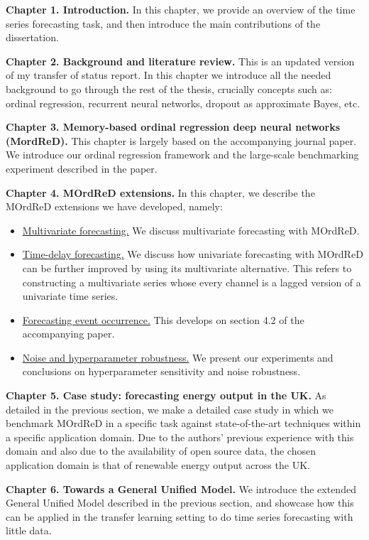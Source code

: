 \documentclass[pdftex,12pt,a4paper]{article}
\theoremstyle{definition}
\theoremstyle{remark}
\begin{document}
\textbf{Chapter 1. Introduction.} In this chapter, we provide an overview of the time series forecasting task, and then introduce the main contributions of the dissertation.

\textbf{Chapter 2. Background and literature review.} This is an updated version of my transfer of status report. In this chapter we introduce all the needed background to go through the rest of the thesis, crucially concepts such as: ordinal regression, recurrent neural networks, dropout as approximate Bayes, etc.

\textbf{Chapter 3. Memory-based ordinal regression deep neural networks (MordReD).} This chapter is largely based on the accompanying journal paper. We introduce our ordinal regression framework and the large-scale benchmarking experiment described in the paper.

\textbf{Chapter 4. MOrdReD extensions.} In this chapter, we describe the MOrdReD extensions we have developed, namely: 
\begin{itemize}
    \item \underline{Multivariate forecasting.} We discuss multivariate forecasting with MOrdReD.
    \item \underline{Time-delay forecasting.} We discuss how univariate forecasting with MOrdReD can be further improved by using its multivariate alternative. This refers to constructing a multivariate series whose every channel is a lagged version of a univariate time series.
    \item \underline{Forecasting event occurrence.} This develops on section 4.2 of the accompanying paper.
    \item \underline{Noise and hyperparameter robustness.} We present our experiments and conclusions on hyperparameter sensitivity and noise robustness.
\end{itemize}

\textbf{Chapter 5. Case study: forecasting energy output in the UK.} As detailed in the previous section, we make a detailed case study in which we benchmark MOrdReD in a specific task against state-of-the-art techniques within a specific application domain. Due to the authors' previous experience with this domain and also due to the availability of open source data, the chosen application domain is that of renewable energy output across the UK.

\textbf{Chapter 6. Towards a General Unified Model.} We introduce the extended General Unified Model described in the previous section, and showcase how this can be applied in the transfer learning setting to do time series forecasting with little data.
\end{document}

